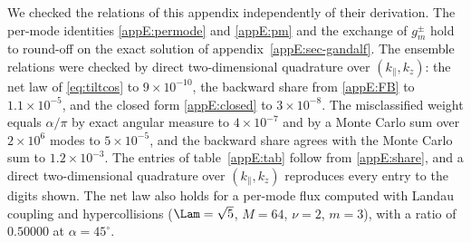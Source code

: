 We checked the relations of this appendix independently of their derivation. The per-mode identities \eqref{appE:permode} and \eqref{appE:pm} and the exchange of $g^\pm_m$ hold to round-off on the exact solution of appendix~\ref{appE:sec-gandalf}. The ensemble relations were checked by direct two-dimensional quadrature over $(k_\parallel,k_z)$: the net law of \eqref{eq:tiltcos} to $9\times10^{-10}$, the backward share from \eqref{appE:FB} to $1.1\times10^{-5}$, and the closed form \eqref{appE:closed} to $3\times10^{-8}$. The misclassified weight equals $\alpha/\pi$ by exact angular measure to $4\times10^{-7}$ and by a Monte Carlo sum over $2\times10^6$ modes to $5\times10^{-5}$, and the backward share agrees with the Monte Carlo sum to $1.2\times10^{-3}$. The entries of table~\ref{appE:tab} follow from \eqref{appE:share}, and a direct two-dimensional quadrature over $(k_\parallel,k_z)$ reproduces every entry to the digits shown. The net law also holds for a per-mode flux computed with Landau coupling and hypercollisions ($\Lam=\sqrt5$, $M=64$, $\nu=2$, $m=3$), with a ratio of $0.50000$ at $\alpha=45^\circ$.
